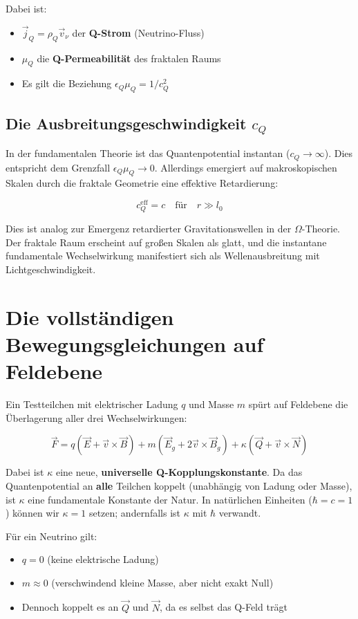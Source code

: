 \documentclass[12pt,a4paper]{article}
\begin{document}
Dabei ist:
\begin{itemize}
    \item \(\vec{j}_Q = \rho_Q \vec{v}_\nu\) der \textbf{Q-Strom} (Neutrino-Fluss)
    \item \(\mu_Q\) die \textbf{Q-Permeabilität} des fraktalen Raums
    \item Es gilt die Beziehung \(\epsilon_Q \mu_Q = 1/c_Q^2\)
\end{itemize}

\subsection{Die Ausbreitungsgeschwindigkeit \(c_Q\)}

In der fundamentalen Theorie ist das Quantenpotential instantan (\(c_Q \to \infty\)). Dies entspricht dem Grenzfall \(\epsilon_Q \mu_Q \to 0\). Allerdings emergiert auf makroskopischen Skalen durch die fraktale Geometrie eine effektive Retardierung:

\[
c_Q^{\text{eff}} = c \quad \text{für} \quad r \gg l_0
\]

Dies ist analog zur Emergenz retardierter Gravitationswellen in der \(\Omega\)-Theorie. Der fraktale Raum erscheint auf großen Skalen als glatt, und die instantane fundamentale Wechselwirkung manifestiert sich als Wellenausbreitung mit Lichtgeschwindigkeit.

\section{Die vollständigen Bewegungsgleichungen auf Feldebene}

Ein Testteilchen mit elektrischer Ladung \(q\) und Masse \(m\) spürt auf Feldebene die Überlagerung aller drei Wechselwirkungen:

\[
\boxed{\vec{F} = q(\vec{E} + \vec{v} \times \vec{B}) + m(\vec{E}_g + 2\vec{v} \times \vec{B}_g) + \kappa(\vec{Q} + \vec{v} \times \vec{N})} \tag{5}
\]

Dabei ist \(\kappa\) eine neue, \textbf{universelle Q-Kopplungskonstante}. Da das Quantenpotential an \textbf{alle} Teilchen koppelt (unabhängig von Ladung oder Masse), ist \(\kappa\) eine fundamentale Konstante der Natur. In natürlichen Einheiten (\(\hbar = c = 1\)) können wir \(\kappa = 1\) setzen; andernfalls ist \(\kappa\) mit \(\hbar\) verwandt.

Für ein Neutrino gilt:
\begin{itemize}
    \item \(q = 0\) (keine elektrische Ladung)
    \item \(m \approx 0\) (verschwindend kleine Masse, aber nicht exakt Null)
    \item Dennoch koppelt es an \(\vec{Q}\) und \(\vec{N}\), da es selbst das Q-Feld trägt
\end{itemize}
\end{document}
